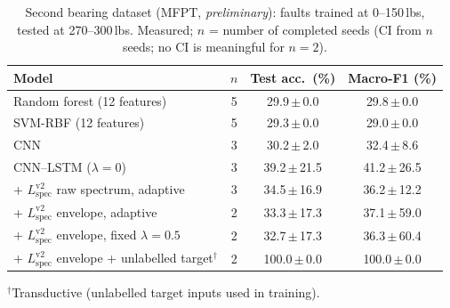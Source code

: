 \begin{table}[t]
\caption{Second bearing dataset (MFPT, \emph{preliminary}): faults trained at 0--150\,lbs, tested at 270--300\,lbs. Measured; $n$ = number of completed seeds (CI from $n$ seeds; no CI is meaningful for $n=2$).}
\label{tab:mfpt}
\centering
\footnotesize
\begin{tabular}{lccc}
\toprule
Model & $n$ & Test acc.\ (\%) & Macro-F1 (\%) \\
\midrule
Random forest (12 features) & 5 & 29.9\,$\pm$\,0.0 & 29.8\,$\pm$\,0.0 \\
SVM-RBF (12 features) & 5 & 29.3\,$\pm$\,0.0 & 29.0\,$\pm$\,0.0 \\
CNN & 3 & 30.2\,$\pm$\,2.0 & 32.4\,$\pm$\,8.6 \\
CNN--LSTM ($\lambda=0$) & 3 & 39.2\,$\pm$\,21.5 & 41.2\,$\pm$\,26.5 \\
\midrule
+ $L_{\mathrm{spec}}^{\mathrm{v2}}$ raw spectrum, adaptive & 3 & 34.5\,$\pm$\,16.9 & 36.2\,$\pm$\,12.2 \\
+ $L_{\mathrm{spec}}^{\mathrm{v2}}$ envelope, adaptive & 2 & 33.3\,$\pm$\,17.3 & 37.1\,$\pm$\,59.0 \\
+ $L_{\mathrm{spec}}^{\mathrm{v2}}$ envelope, fixed $\lambda=0.5$ & 2 & 32.7\,$\pm$\,17.3 & 36.3\,$\pm$\,60.4 \\
+ $L_{\mathrm{spec}}^{\mathrm{v2}}$ envelope + unlabelled target$^{\dagger}$ & 2 & 100.0\,$\pm$\,0.0 & 100.0\,$\pm$\,0.0 \\
\bottomrule
\end{tabular}
\par\vspace{2pt}\parbox{\columnwidth}{\scriptsize $^{\dagger}$Transductive (unlabelled target inputs used in training).}
\end{table}
